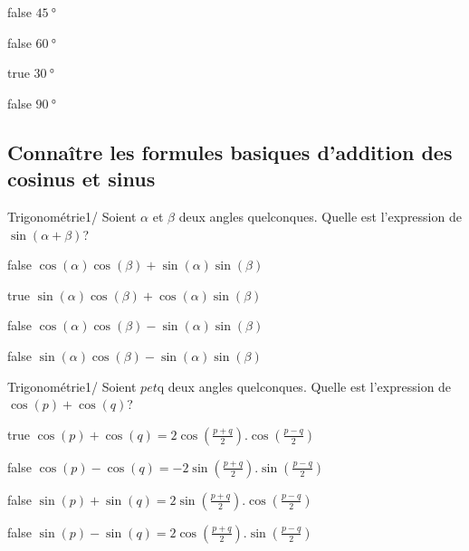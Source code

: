 \documentclass[11pt]{article}
\begin{document}
            \begin{reponses}
            	\item[false]$\SI{45}{\degree}$
            	\item[false] $\SI{60}{\degree}$
                \item[true] $\SI{30}{\degree}$
                \item[false] $\SI{90}{\degree}$
            \end{reponses}
			
			
			\subsection{Connaître les formules basiques d’addition des cosinus et sinus}
        
            \begin{question}{47}{Trigonométrie}{1}{/}
				Soient $\alpha$ et $\beta$ deux angles quelconques. Quelle est l'expression de $\sin(\alpha+\beta)$?
            \end{question}

            \begin{reponses}
            	\item[false] $\cos(\alpha)\cos(\beta)+\sin(\alpha)\sin(\beta)$
            	\item[true] $\sin(\alpha)\cos(\beta)+\cos(\alpha)\sin(\beta)$
                \item[false] $\cos(\alpha)\cos(\beta)-\sin(\alpha)\sin(\beta)$
                \item[false] $\sin(\alpha)\cos(\beta)-\sin(\alpha)\sin(\beta)$
            \end{reponses}
			
			
			\begin{question}{47}{Trigonométrie}{1}{/}
				Soient $p et $q deux angles quelconques. Quelle est l'expression de $\cos(p)+\cos(q)$?
            \end{question}

            \begin{reponses}
            	\item[true] $\cos(p) + \cos(q) = 2\cos(\frac{p+q}{2}).\cos(\frac{p-q}{2})$
            	\item[false] $\cos(p) - \cos(q) = -2\sin(\frac{p+q}{2}).\sin(\frac{p-q}{2})$
                \item[false] $\sin(p) + \sin(q) = 2\sin(\frac{p+q}{2}).\cos(\frac{p-q}{2})$
                \item[false] $\sin(p) - \sin(q) = 2\cos(\frac{p+q}{2}).\sin(\frac{p-q}{2}) $
            \end{reponses}
			
\end{document}
